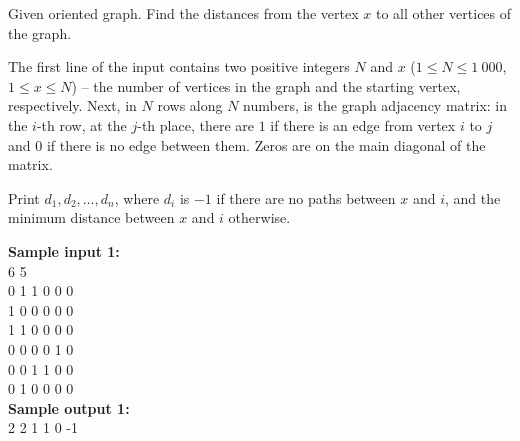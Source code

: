 \documentclass[a4paper]{article}
\begin{document}
Given oriented graph. Find the distances from the vertex $x$ to all other vertices of the graph.

The first line of the input contains two positive integers $N$ and $x$ ($1 \le N \le 1 \ 000$, $1 \le x \le N$) -- the number of vertices in the graph and the starting vertex, respectively. Next, in $N$ rows along $N$ numbers, is the graph adjacency matrix: in the $i$-th row, at the $j$-th place, there are $1$ if there is an edge from vertex $i$ to $j$ and $0$ if there is no edge between them. Zeros are on the main diagonal of the matrix.

Print $d_1, d_2, \dots, d_n$, where $d_i$ is $-1$ if there are no paths between $x$ and $i$, and the minimum distance between $x$ and $i$ otherwise.

\SPACE

\noindent \textbf{Sample input 1:}\\
6 5\\
0 1 1 0 0 0\\
1 0 0 0 0 0\\
1 1 0 0 0 0\\
0 0 0 0 1 0\\
0 0 1 1 0 0\\
0 1 0 0 0 0\\


\noindent \textbf{Sample output 1:}\\
2 2 1 1 0 -1
\end{document}
